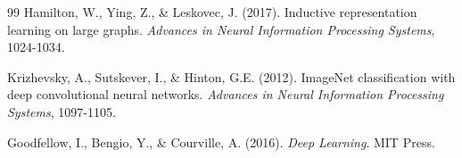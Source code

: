 \documentclass[11pt,a4paper]{article}
\begin{document}
\begin{thebibliography}{99}
Hamilton, W., Ying, Z., \& Leskovec, J. (2017). Inductive representation learning on large graphs. \textit{Advances in Neural Information Processing Systems}, 1024-1034.

Krizhevsky, A., Sutskever, I., \& Hinton, G.E. (2012). ImageNet classification with deep convolutional neural networks. \textit{Advances in Neural Information Processing Systems}, 1097-1105.

Goodfellow, I., Bengio, Y., \& Courville, A. (2016). \textit{Deep Learning}. MIT Press.

\end{thebibliography}
\end{document}
